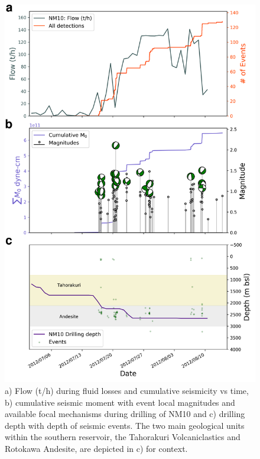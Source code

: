 \begin{figure}[h!]
\begin{center}
\includegraphics[width=0.84\columnwidth]{Chapter_3_Nga/figures/Multiplet_150_vs_flow_cum_NM10_losses/Full_final_cat_flow_mags_FMs_depth_NM10_Drilling_12-5_GrowClust_no_diff_ABC_original}
\caption{{a) Flow (t/h) during fluid losses and cumulative seismicity vs time, b)
cumulative seismic moment with event local magnitudes and available
focal mechanisms during drilling of NM10 and c) drilling depth with
depth of seismic events. The two main geological units within the
southern reservoir, the Tahorakuri Volcaniclastics and Rotokawa
Andesite, are depicted in c) for context.
{\label{703798}}%
}}
\end{center}
\end{figure}

